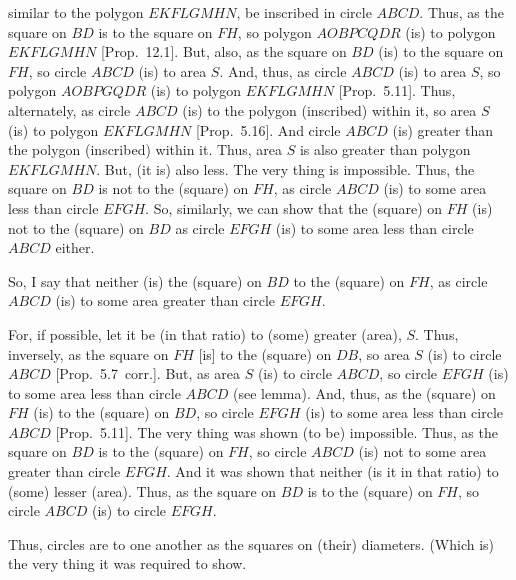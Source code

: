 \begin{Parallel}{}{}
{ similar to the polygon $EKFLGMHN$, be inscribed in circle
 $ABCD$. Thus, as the square on $BD$ is to the square on $FH$, so
polygon $AOBPCQDR$ (is) to polygon $EKFLGMHN$ [Prop.~12.1]. But, also, as the square on $BD$ (is) to the square on $FH$, so circle $ABCD$ (is) to area $S$. And, thus, as
circle $ABCD$ (is) to area $S$, so polygon $AOBPGQDR$ (is) to
polygon $EKFLGMHN$ [Prop.~5.11]. Thus, alternately, as circle $ABCD$
(is) to the polygon (inscribed) within it, so area $S$ (is) to polygon $EKFLGMHN$
[Prop.~5.16]. And circle $ABCD$ (is)
greater than the polygon (inscribed) within it. Thus, area $S$ is also greater than polygon 
$EKFLGMHN$. But, (it is) also less. The very thing
is impossible. Thus, the square on $BD$ is not to the (square) on $FH$, as
circle $ABCD$ (is) to some area less than circle $EFGH$. So, similarly,
we can show that the (square) on $FH$ (is) not to the (square) on 
$BD$ as circle $EFGH$ (is) to some area less than circle $ABCD$ either.

So, I say that neither (is) the (square) on $BD$ to the (square) on $FH$,
as circle $ABCD$ (is) to some area greater than circle $EFGH$.

For, if possible, let it be (in that ratio) to (some)  greater (area), $S$. Thus, inversely, 
as the square on $FH$ [is] to the (square) on $DB$, so area $S$ (is) to circle $ABCD$ [Prop.~5.7~corr.]. But, as area $S$ (is) to circle $ABCD$, so circle $EFGH$
(is) to some area less than circle $ABCD$ (see lemma). And, thus, as the (square) on $FH$ (is) to the (square) on $BD$, so circle $EFGH$ (is) to some area
less than  circle $ABCD$ [Prop.~5.11]. The very thing was shown (to be) impossible.
Thus, as the square on $BD$ is to the (square) on $FH$, so circle $ABCD$
(is) not to some area greater than circle $EFGH$. And it was shown that neither (is it in that ratio) to (some) lesser (area). Thus, as the square on $BD$ is to the (square) on $FH$, so circle $ABCD$ (is) to circle $EFGH$.

Thus, circles are to one another as the squares on (their) diameters. (Which is) the very thing it was required to show.}
\end{Parallel}

